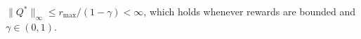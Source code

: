 

\begin{assumption}[Regularity of $Q^*$]
\label{assum:qstar_l2}
$\|Q^*\|_\infty\leq r_{\max}/(1-\gamma)<\infty$,
which holds whenever rewards are bounded
and $\gamma\in(0,1)$.
\end{assumption}




    





